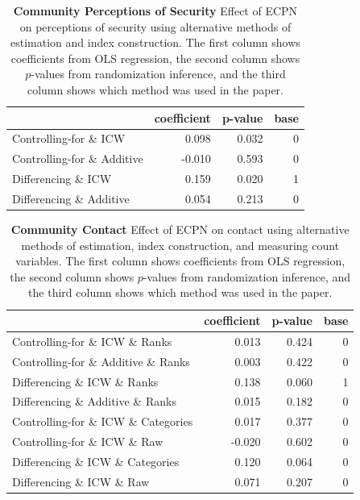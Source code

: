 \documentclass[
]{article}
\begin{document}
\begin{table}[H]
\begin{center}
\label{tab:security_tab}
\caption{\textbf{Community Perceptions of Security} Effect of ECPN on perceptions of security using alternative methods of estimation and index construction. The first column shows coefficients from OLS regression, the second column shows $p$-values from randomization inference, and the third column shows which method was used in the paper.}
\smallskip

\begin{tabular}{l|r|r|r}
\hline
  & coefficient & p-value & base\\
\hline
Controlling-for \& ICW & 0.098 & 0.032 & 0\\
\hline
Controlling-for \& Additive & -0.010 & 0.593 & 0\\
\hline
Differencing \& ICW & 0.159 & 0.020 & 1\\
\hline
Differencing \& Additive & 0.054 & 0.213 & 0\\
\hline
\end{tabular}


\end{center}
\end{table}

\begin{table}[H]
\begin{center}
\label{tab:contact_tab}
\caption{\textbf{Community Contact} Effect of ECPN on contact using alternative methods of estimation, index construction, and measuring count variables. The first column shows coefficients from OLS regression, the second column shows $p$-values from randomization inference, and the third column shows which method was used in the paper.}
\smallskip

\begin{tabular}{l|r|r|r}
\hline
  & coefficient & p-value & base\\
\hline
Controlling-for \& ICW \& Ranks & 0.013 & 0.424 & 0\\
\hline
Controlling-for \& Additive \& Ranks & 0.003 & 0.422 & 0\\
\hline
Differencing \& ICW \& Ranks & 0.138 & 0.060 & 1\\
\hline
Differencing \& Additive \& Ranks & 0.015 & 0.182 & 0\\
\hline
Controlling-for \& ICW \& Categories & 0.017 & 0.377 & 0\\
\hline
Controlling-for \& ICW \& Raw & -0.020 & 0.602 & 0\\
\hline
Differencing \& ICW \& Categories & 0.120 & 0.064 & 0\\
\hline
Differencing \& ICW \& Raw & 0.071 & 0.207 & 0\\
\hline
\end{tabular}


\end{center}
\end{table}
\end{document}
